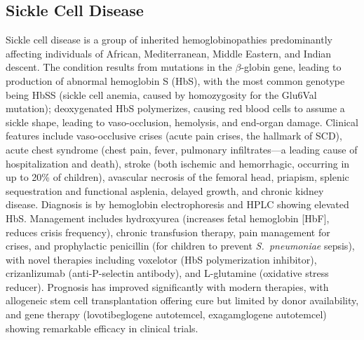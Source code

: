 \subsection{Sickle Cell Disease}
\label{sec:Sickle Cell Disease}
Sickle cell disease is a group of inherited hemoglobinopathies predominantly affecting individuals of African, Mediterranean, Middle Eastern, and Indian descent. The condition results from mutations in the $\beta$-globin gene, leading to production of abnormal hemoglobin S (HbS), with the most common genotype being HbSS (sickle cell anemia, caused by homozygosity for the Glu6Val mutation); deoxygenated HbS polymerizes, causing red blood cells to assume a sickle shape, leading to vaso-occlusion, hemolysis, and end-organ damage. Clinical features include vaso-occlusive crises (acute pain crises, the hallmark of SCD), acute chest syndrome (chest pain, fever, pulmonary infiltrates---a leading cause of hospitalization and death), stroke (both ischemic and hemorrhagic, occurring in up to 20\% of children), avascular necrosis of the femoral head, priapism, splenic sequestration and functional asplenia, delayed growth, and chronic kidney disease. Diagnosis is by hemoglobin electrophoresis and HPLC showing elevated HbS. Management includes hydroxyurea (increases fetal hemoglobin [HbF], reduces crisis frequency), chronic transfusion therapy, pain management for crises, and prophylactic penicillin (for children to prevent \textit{S.~pneumoniae} sepsis), with novel therapies including voxelotor (HbS polymerization inhibitor), crizanlizumab (anti-P-selectin antibody), and L-glutamine (oxidative stress reducer). Prognosis has improved significantly with modern therapies, with allogeneic stem cell transplantation offering cure but limited by donor availability, and gene therapy (lovotibeglogene autotemcel, exagamglogene autotemcel) showing remarkable efficacy in clinical trials.

